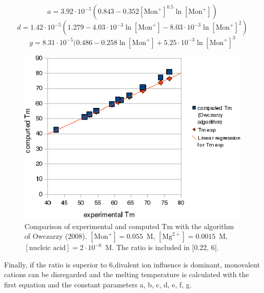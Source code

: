 \documentclass{article}
\begin{document}
\begin{displaymath}
a = 3.92\cdot{}10^{-5} (0.843 - 0.352 [\mbox{Mon}^+]^{0.5} \ln [\mbox{Mon}^+]) 
\end{displaymath}
\begin{displaymath}
d = 1.42\cdot{}10^{-5} (1.279 - 4.03\cdot{}10^{-3} \ln [\mbox{Mon}^+] -
8.03\cdot{}10^{-3} \ln [\mbox{Mon}^+]^{2})
\end{displaymath}
\begin{displaymath}
g = 8.31\cdot{}10^{-5} (0.486 - 0.258 \ln [\mbox{Mon}^+] + 5.25\cdot{}10^{-3}
\ln [\mbox{Mon}^+]^{3} 
\end{displaymath}

\begin{figure}[H]
\includegraphics{Owczarzy3.eps}
\caption{Comparison of experimental and computed Tm with the algorithm of Owczarzy (2008). 
$[\mbox{Mon}^+] = 0.055$~M, $[\mbox{Mg}^{2+}] = 0.0015$~M, $[\mbox{nucleic acid}] =
2\cdot{}10^{-6}$~M. The ratio is included in [0.22, 6[.}
\end{figure}

Finally, if the ratio is superior to 6,divalent ion influence is dominant, monovalent cations can be 
disregarded and the melting temperature is calculated with the first equation and the constant parameters a, b, c, d,
e, f, g.
\end{document}
